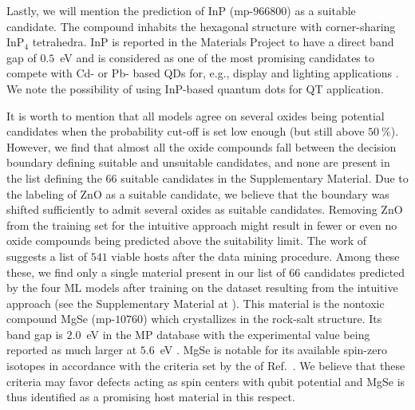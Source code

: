 \documentclass[superscriptaddress,unsortedaddress,
 amsmath,amssymb,
 aps,
]{revtex4-2}
\newcommand{\oliver}[1]{\textcolor{violet}{#1}}
\begin{document}
Lastly, we will mention the prediction of InP (mp-$966800$) as a suitable candidate. The compound inhabits the hexagonal structure with corner-sharing InP$_4$ tetrahedra. InP is reported in the Materials Project to have a direct band gap of $0.5$~eV and is considered as one of the most promising candidates to compete with 
Cd- or Pb- based QDs for, e.g., display and lighting applications \cite{Zhang2020a, Won2019}. 
We note the possibility of using InP-based quantum dots for QT application. 

It is worth to mention that all models agree on several oxides being potential candidates when the probability cut-off is set low enough (but still above $50 \ \%$). However, we find that almost all the oxide compounds fall between the decision boundary defining suitable and unsuitable candidates, and none are present in the list defining the $66$ suitable candidates in the Supplementary Material. Due to the labeling of ZnO as a suitable candidate, we believe that the boundary was shifted sufficiently to admit several oxides as suitable candidates. 
Removing ZnO from the training set for the intuitive approach might result in fewer or even no oxide compounds being predicted above the suitability limit. 
The work of \citeauthor{Ferrenti2020} \cite{Ferrenti2020} suggests a list of $541$ viable hosts after the data mining procedure.  
Among these these, we find only a single material present in our list of $66$ candidates predicted by the four ML models after training on the dataset resulting from the intuitive approach (see the Supplementary Material at \cite{supplementary}). This material is the nontoxic compound MgSe (mp-$10760$) which crystallizes in the rock-salt structure. Its band gap is $2.0$~eV in the MP database with the experimental value being reported as much larger at $5.6$~eV  \cite{SaumGeorge1959}. MgSe is notable for its available spin-zero isotopes in accordance with the criteria set by the of Ref.~\cite{Ferrenti2020}. We believe that these criteria may favor defects acting as spin centers with qubit potential and MgSe is thus identified as a promising host material in this respect.  
\end{document}
